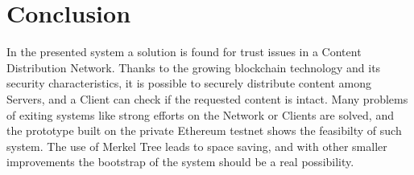 \documentclass[conference,compsoc]{IEEEtran}
\begin{document}




\section{Conclusion}

In the presented system a solution is found for trust issues in a Content Distribution Network. Thanks to the growing blockchain technology and its security characteristics, it is possible to securely distribute content among Servers, and a Client can check if the requested content is intact. Many problems of exiting systems like strong efforts on the Network or Clients are solved, and the prototype built on the private Ethereum testnet shows the feasibilty of such system. The use of Merkel Tree leads to space saving, and with other smaller improvements the bootstrap of the system should be a real possibility.









%







\end{document}
